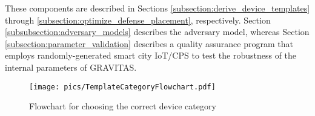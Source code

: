 \documentclass[10pt,journal,compsoc]{IEEEtran}
\begin{document}
These components are described in Sections \ref{subsection:derive_device_templates} through 
\ref{subsection:optimize_defense_placement}, respectively. Section 
\ref{subsubsection:adversary_models} describes the adversary model, whereas Section 
\ref{subsection:parameter_validation} describes a quality assurance program that employs 
randomly-generated smart city IoT/CPS to test the robustness of the internal parameters of
GRAVITAS.



\begin{figure*}[t!]
\centerline{\texttt{[image: pics/TemplateCategoryFlowchart.pdf]}}
\caption{Flowchart for choosing the correct device category}
\label{fig:device_category_flowchart}
\vspace{12pt}

\small
\end{figure*}
\end{document}
